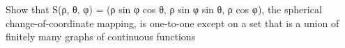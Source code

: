 Show that S(ρ, θ, φ) = (ρ sin φ cos θ, ρ sin φ sin θ, ρ cos φ), the spherical change-of-coordinate mapping, is one-to-one except on a set that is a union of finitely many graphs of continuous functions
